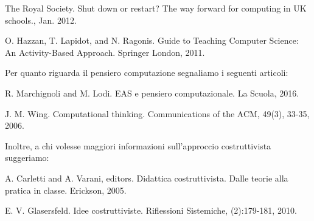 \documentclass[12pt]{article}
\begin{document}
The Royal Society. Shut down or restart? The way forward for computing in UK schools., Jan. 2012.

O. Hazzan, T. Lapidot, and N. Ragonis. Guide to Teaching Computer Science: An Activity-Based Approach. Springer London, 2011.

Per quanto riguarda il pensiero computazione segnaliamo i seguenti articoli:

R. Marchignoli and M. Lodi. EAS e pensiero computazionale. La Scuola, 2016.

J. M. Wing. Computational thinking. Communications of the ACM, 49(3), 33-35, 2006.

Inoltre, a chi volesse maggiori informazioni sull'approccio costruttivista suggeriamo:

A. Carletti and A. Varani, editors. Didattica costruttivista. Dalle teorie alla pratica in classe. Erickson, 2005.

E. V. Glasersfeld. Idee costruttiviste. Riflessioni Sistemiche, (2):179-181, 2010.


%
%
\end{document}
